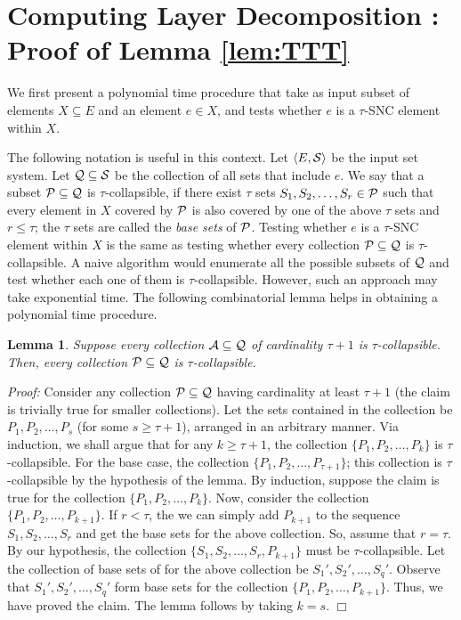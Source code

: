 \documentclass[11pt]{article}
\newtheorem{lemma}[theorem]{\bf Lemma}
\newcommand {\myproof} {{\it Proof: }}
\newcommand {\qed} {\hfill$\Box$}
\newcommand{\calA} {{\cal A}}
\newcommand{\calP} {{\cal P}}
\newcommand{\calQ} {{\cal Q}}
\newcommand{\calS} {{\cal S}}
\newcommand{\pair}[2] {\langle #1, #2\rangle}
\begin{document}
\section{Computing Layer Decomposition : Proof of Lemma \ref{lem:TTT}}
\label{sec:layer-compute}
We first present a polynomial time procedure
that take as input subset of elements $X\subseteq E$ and an element $e\in X$,
and tests whether $e$ is a $\tau$-SNC element within $X$.

The following notation is useful in this context.
Let $\pair{E}{\calS}$ be the input set system.
Let $\calQ \subseteq \calS$ be the collection of all sets that include $e$.
We say that a subset $\calP \subseteq \calQ$ is $\tau$-collapsible, if
there exist $\tau$ sets $S_1, S_2, \ldots, S_r\in \calP$ such that
every element in $X$ covered by $\calP$ is also covered by one of the above $\tau$ sets
and $r\leq \tau$; the $\tau$ sets are called the {\em base sets} of $\calP$.
Testing whether $e$ is a $\tau$-SNC element within $X$ is the same as testing
whether every collection $\calP\subseteq \calQ$ is $\tau$-collapsible.
A naive algorithm would enumerate all the possible subsets of $\calQ$ and test whether each one of them
is $\tau$-collapsible. However, such an approach may take exponential time.
The following combinatorial lemma helps in obtaining a polynomial time procedure.

\begin{lemma}
\label{lem:SSS}
Suppose every collection $\calA \subseteq \calQ$ of cardinality $\tau+1$ is $\tau$-collapsible.
Then, every collection $\calP\subseteq \calQ$ is $\tau$-collapsible.
\end{lemma}
\myproof
Consider any collection $\calP\subseteq \calQ$ having cardinality at least $\tau+1$ 
(the claim is trivially true for smaller collections). 
Let the sets contained in the collection be $P_1, P_2, \ldots, P_s$ (for some $s\geq \tau+1$), arranged
in an arbitrary manner.
Via induction, we shall argue that for any $k\geq \tau+1$, the collection 
$\{P_1, P_2, \ldots, P_k\}$ is $\tau$-collapsible.
For the base case, the collection 
$\{P_1, P_2, \ldots, P_{\tau+1}\}$; this collection is $\tau$-collapsible by the hypothesis of the lemma.
By induction, suppose the claim is true for the collection $\{P_1, P_2, \ldots, P_k\}$.
Now, consider the collection $\{P_1, P_2, \ldots, P_{k+1}\}$.
If $r<\tau$, the we can simply add $P_{k+1}$ to the sequence $S_1, S_2, \ldots, S_r$
and get the base sets for the above collection. So, assume that $r=\tau$.
By our hypothesis, the collection $\{S_1, S_2, \ldots, S_r, P_{k+1}\}$ must be $\tau$-collapsible.
Let the collection of base sets of for the above collection be $S_1', S_2', \ldots, S_q'$.
Observe that $S_1', S_2', \ldots, S_q'$ form base sets for the collection $\{P_1, P_2, \ldots, P_{k+1}\}$.
Thus, we have proved the claim. The lemma follows by taking $k=s$.
\qed
\end{document}
